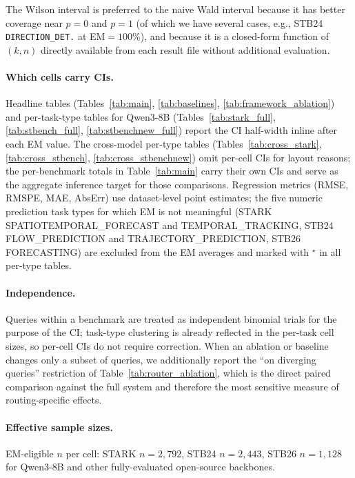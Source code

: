 The Wilson interval is preferred to the naive Wald interval because it has better coverage near $p=0$ and $p=1$ (of which we have several cases, e.g., STB24 \texttt{DIRECTION\_DET.} at EM$=100\%$), and because it is a closed-form function of $(k, n)$ directly available from each result file without additional evaluation.

\paragraph{Which cells carry CIs.}  Headline tables (Tables~\ref{tab:main}, \ref{tab:baselines}, \ref{tab:framework_ablation}) and per-task-type tables for Qwen3-8B (Tables~\ref{tab:stark_full}, \ref{tab:stbench_full}, \ref{tab:stbenchnew_full}) report the CI half-width inline after each EM value.  The cross-model per-type tables (Tables~\ref{tab:cross_stark}, \ref{tab:cross_stbench}, \ref{tab:cross_stbenchnew}) omit per-cell CIs for layout reasons; the per-benchmark totals in Table~\ref{tab:main} carry their own CIs and serve as the aggregate inference target for those comparisons.  Regression metrics (RMSE, RMSPE, MAE, AbsErr) use dataset-level point estimates; the five numeric prediction task types for which EM is not meaningful (STARK SPATIOTEMPORAL\_FORECAST and TEMPORAL\_TRACKING, STB24 FLOW\_PREDICTION and TRAJECTORY\_PREDICTION, STB26 FORECASTING) are excluded from the EM averages and marked with $^\star$ in all per-type tables.

\paragraph{Independence.}  Queries within a benchmark are treated as independent binomial trials for the purpose of the CI; task-type clustering is already reflected in the per-task cell sizes, so per-cell CIs do not require correction.  When an ablation or baseline changes only a subset of queries, we additionally report the ``on diverging queries'' restriction of Table~\ref{tab:router_ablation}, which is the direct paired comparison against the full system and therefore the most sensitive measure of routing-specific effects.

\paragraph{Effective sample sizes.}  EM-eligible $n$ per cell: STARK $n=2{,}792$, STB24 $n=2{,}443$, STB26 $n=1{,}128$ for Qwen3-8B and other fully-evaluated open-source backbones.


